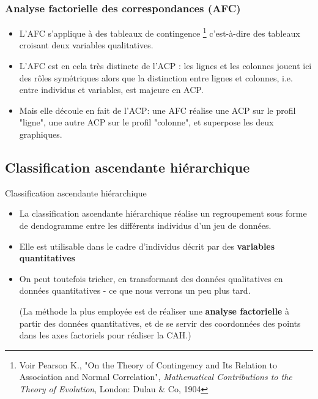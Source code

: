 \documentclass{beamer}
\begin{document}
\begin{frame}[fragile]
\frametitle{Analyse factorielle des correspondances (AFC)}

\begin{itemize}
	\item L'AFC s’applique à des \alert{tableaux de contingence} \footnote{Voir Pearson K., "On the Theory of Contingency and Its Relation to Association and Normal Correlation", \textit{Mathematical Contributions to the Theory of Evolution}, London: Dulau $\&$ Co, 1904} c'est-à-dire des tableaux croisant deux variables qualitatives.
	\item L'AFC est en cela très distincte de l'ACP :  les lignes et les colonnes jouent ici des rôles symétriques alors que la distinction entre lignes et colonnes, i.e. entre individus et variables, est majeure en ACP.
	\item Mais elle découle en fait de l'ACP: une AFC réalise une ACP sur le profil "ligne", une autre ACP sur le profil "colonne", et superpose les deux graphiques.
	
\end{itemize}
\end{frame}

\subsection{Classification ascendante hiérarchique}

\begin{frame}{Classification ascendante hiérarchique}


\begin{itemize}
	\item La \alert{classification ascendante hiérarchique}  réalise un regroupement sous forme de dendogramme entre les différents individus d'un jeu de données.
	\item Elle est utilisable dans le cadre d'individus décrit par des \textbf{variables quantitatives}
	\item On peut toutefois tricher, en transformant des données qualitatives en données quantitatives - ce que nous verrons un peu plus tard.
	
	(La méthode la plus employée est de réaliser une \textbf{analyse factorielle} à partir des données quantitatives, et de se servir des coordonnées des points dans les axes factoriels pour réaliser la CAH.)
	
\end{itemize}

\end{frame}
\end{document}
